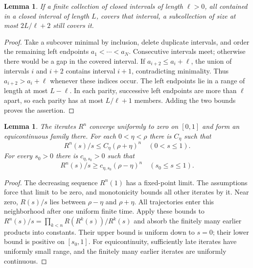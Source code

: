 \documentclass[11pt,a4paper]{article}
\newtheorem{lemma}[theorem]{Lemma}
\theoremstyle{remark}
\begin{document}
\begin{lemma}\label{lem:intervals}
If a finite collection of closed intervals of length $\ell>0$, all
contained in a closed interval of length $L$, covers that interval, a
subcollection of size at most
$2L/\ell+2$ still covers it.
\end{lemma}
\begin{proof}
Take a subcover minimal by inclusion, delete duplicate intervals, and
order the remaining left endpoints $a_1<\cdots<a_N$.
Consecutive intervals meet; otherwise there would be a gap in the
covered interval. If $a_{i+2}\leq a_i+\ell$, the union of intervals $i$
and $i+2$ contains interval $i+1$, contradicting minimality. Thus
$a_{i+2}>a_i+\ell$ whenever these indices occur.
The left endpoints lie in a range of length at most $L-\ell$.
In each parity, successive left endpoints are more than $\ell$ apart,
so each parity has at most $L/\ell+1$ members. Adding the two bounds
proves the assertion.
\end{proof}

\begin{lemma}\label{lem:radial}
The iterates $R^n$ converge uniformly to zero on $[0,1]$ and form an
equicontinuous family there. For each $0<\eta<\rho$ there is $C_\eta$ such
that
\[
 R^n(s)/s\leq C_\eta(\rho+\eta)^n\quad(0<s\leq1).
\]
For every $s_0>0$ there is $c_{\eta,s_0}>0$ such that
\[
 R^n(s)/s\geq c_{\eta,s_0}(\rho-\eta)^n\quad(s_0\leq s\leq1).
\]
\end{lemma}
\begin{proof}
The decreasing sequence $R^n(1)$ has a fixed-point limit. The assumptions
force that limit to be zero, and monotonicity bounds all other iterates
by it. Near zero, $R(s)/s$ lies between $\rho-\eta$ and $\rho+\eta$.
All trajectories enter this neighborhood after one uniform finite time.
Apply these bounds to
$R^n(s)/s=\prod_{k<n}R(R^k(s))/R^k(s)$ and absorb the finitely many earlier
products into constants. Their upper bound is uniform down to $s=0$;
their lower bound is positive on $[s_0,1]$.
For equicontinuity, sufficiently late iterates have uniformly small range,
and the finitely many earlier iterates are uniformly continuous.
\end{proof}
\end{document}
